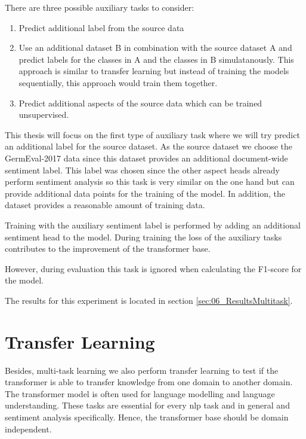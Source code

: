 There are three possible auxiliary tasks to consider:


\begin{enumerate}
	\item Predict additional label from the source data
	\item Use an additional dataset B in combination with the source dataset A and predict labels for the classes in A and the classes in B simulatanously. This approach is similar to transfer learning but instead of training the models sequentially, this approach would train them together.
	\item Predict additional aspects of the source data which can be trained unsupervised.
\end{enumerate}

This thesis will focus on the first type of auxiliary task where we will try predict an additional label for the source dataset. As the source dataset we choose the GermEval-2017 data since this dataset provides an additional document-wide sentiment label. This label was chosen since the other aspect heads already perform sentiment analysis so this task is very similar on the one hand but can provide additional data points for the training of the model. In addition, the dataset provides a reasonable amount of training data.

Training with the auxiliary sentiment label is performed by adding an additional sentiment head to the model. During training the loss of the auxiliary tasks contributes to the improvement of the transformer base.

However, during evaluation this task is ignored when calculating the F1-score for the model.
\medskip

The results for this experiment is located in section \ref{sec:06_ResultsMultitask}.



\section{Transfer Learning}
\label{sec:04_transferLearning}

Besides, multi-task learning we also perform transfer learning to test if the transformer is able to transfer knowledge from one domain to another domain. The transformer model is often used for language modelling and language understanding. These tasks are essential for every \gls{nlp} task and in general and sentiment analysis specifically. Hence, the transformer base should be domain independent. 
\medskip

